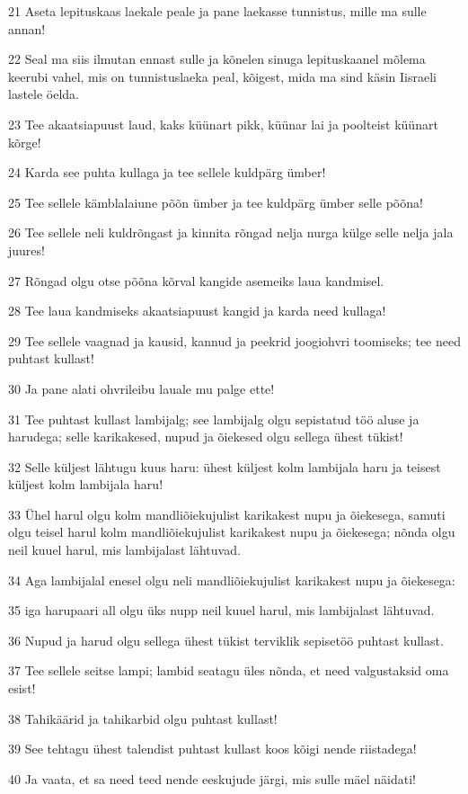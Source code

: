 \par 21 Aseta lepituskaas laekale peale ja pane laekasse tunnistus, mille ma sulle annan!
\par 22 Seal ma siis ilmutan ennast sulle ja kõnelen sinuga lepituskaanel mõlema keerubi vahel, mis on tunnistuslaeka peal, kõigest, mida ma sind käsin Iisraeli lastele öelda.
\par 23 Tee akaatsiapuust laud, kaks küünart pikk, küünar lai ja poolteist küünart kõrge!
\par 24 Karda see puhta kullaga ja tee sellele kuldpärg ümber!
\par 25 Tee sellele kämblalaiune põõn ümber ja tee kuldpärg ümber selle põõna!
\par 26 Tee sellele neli kuldrõngast ja kinnita rõngad nelja nurga külge selle nelja jala juures!
\par 27 Rõngad olgu otse põõna kõrval kangide asemeiks laua kandmisel.
\par 28 Tee laua kandmiseks akaatsiapuust kangid ja karda need kullaga!
\par 29 Tee sellele vaagnad ja kausid, kannud ja peekrid joogiohvri toomiseks; tee need puhtast kullast!
\par 30 Ja pane alati ohvrileibu lauale mu palge ette!
\par 31 Tee puhtast kullast lambijalg; see lambijalg olgu sepistatud töö aluse ja harudega; selle karikakesed, nupud ja õiekesed olgu sellega ühest tükist!
\par 32 Selle küljest lähtugu kuus haru: ühest küljest kolm lambijala haru ja teisest küljest kolm lambijala haru!
\par 33 Ühel harul olgu kolm mandliõiekujulist karikakest nupu ja õiekesega, samuti olgu teisel harul kolm mandliõiekujulist karikakest nupu ja õiekesega; nõnda olgu neil kuuel harul, mis lambijalast lähtuvad.
\par 34 Aga lambijalal enesel olgu neli mandliõiekujulist karikakest nupu ja õiekesega:
\par 35 iga harupaari all olgu üks nupp neil kuuel harul, mis lambijalast lähtuvad.
\par 36 Nupud ja harud olgu sellega ühest tükist terviklik sepisetöö puhtast kullast.
\par 37 Tee sellele seitse lampi; lambid seatagu üles nõnda, et need valgustaksid oma esist!
\par 38 Tahikäärid ja tahikarbid olgu puhtast kullast!
\par 39 See tehtagu ühest talendist puhtast kullast koos kõigi nende riistadega!
\par 40 Ja vaata, et sa need teed nende eeskujude järgi, mis sulle mäel näidati!

